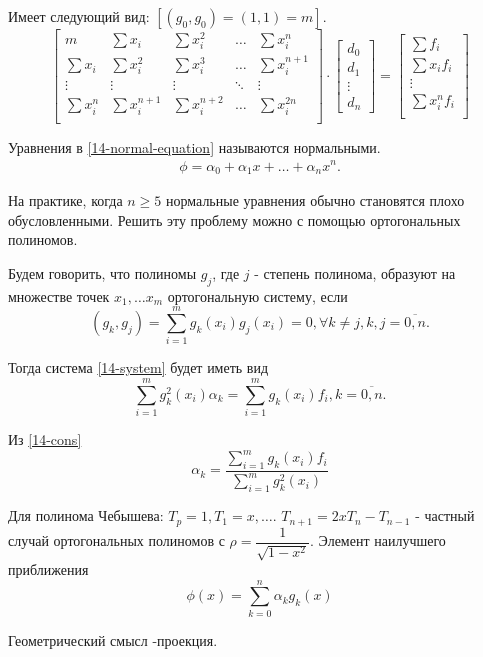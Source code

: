 Имеет следующий вид: $[(g_0, g_0) = (1, 1) = m]$.
\begin{equation}
  \label{14-normal-equation}
  \begin{bmatrix}
    m & \sum\limits x_i & \sum\limits x_i^2 & \ldots & \sum x_i^n\\
    \sum x_i & \sum x_i^2 & \sum x_i^3 & \ldots & \sum x_i^{n + 1}\\
    \vdots & \vdots & \vdots & \ddots & \vdots\\
    \sum x_i^n & \sum x_i^{n + 1} & \sum x_i^{n + 2} & \ldots & \sum x_i^{2n}\\
  \end{bmatrix}\cdot
  \begin{bmatrix}
    d_0\\
    d_1\\
    \vdots\\
    d_n
  \end{bmatrix}
  = \begin{bmatrix}
    \sum f_i\\
    \sum x_i f_i\\
    \vdots\\
    \sum x_i^nf_i\\
  \end{bmatrix}
\end{equation}

Уравнения в \eqref{14-normal-equation} называются нормальными.
\begin{align*}
  \phi = \alpha_0 + \alpha_1x + \ldots + \alpha_nx^n.
\end{align*}

На практике, когда $n \geqslant 5$ нормальные уравнения обычно становятся плохо
обусловленными. Решить эту проблему можно с помощью ортогональных полиномов.

Будем говорить, что полиномы $g_j$, где $j$ - степень полинома, образуют на
множестве точек $x_1, \ldots x_m$ ортогональную систему, если
\begin{equation}
  (g_k, g_j) = \sum\limits_{i = 1}^m g_k(x_i)g_j(x_i) = 0, \forall k \neq j,
  k, j = \overline{0, n}.
\end{equation}

Тогда система \eqref{14-system} будет иметь вид
\begin{equation}
  \label{14-cons}
  \sum\limits_{i = 1}^mg_k^2(x_i)\alpha_k = \sum\limits_{i = 1}^mg_k(x_i)f_i,
  k = \overline{0, n}.
\end{equation}

Из \eqref{14-cons}
\begin{equation}
  \alpha_k = \dfrac{\sum\limits_{i = 1}^m g_k(x_i)f_i}
                   {\sum\limits_{i = 1}^m g_k^2(x_i)}
\end{equation}

Для полинома Чебышева: $T_p = 1, T_1 = x, \ldots$.
$T_{n + 1} = 2xT_n - T_{n - 1}$ - частный случай ортогональных полиномов с
$\rho = \dfrac{1}{\sqrt{1 - x^2}}$. Элемент наилучшего приближения
\begin{equation}
  \phi(x) = \sum\limits_{k = 0}^n\alpha_kg_k(x)
\end{equation}

Геометрический смысл -проекция.
